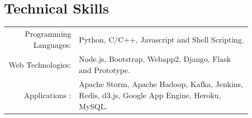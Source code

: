\section{Technical Skills}
\renewcommand{\arraystretch}{1}%
\begin{tabular}{rl}

Programming Languages: &  Python, C/C++, Javascript and Shell Scripting.\\
Web Technologies: & Node.js, Bootstrap, Webapp2, Django, Flask and Prototype.\\
Applications : & Apache Storm, Apache Hadoop, Kafka, Jenkins, Redis, d3.js, Google App Engine, Heroku, MySQL.\\
\end{tabular}
\vspace{5pt}
